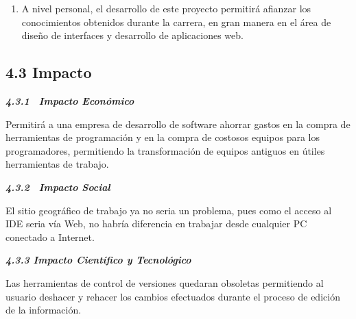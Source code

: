 \documentclass[12pt,letterpaper,oneside]{article}
\begin{document}
\bigskip


\begin{enumerate}
\item
A nivel personal, el desarrollo de este proyecto permitirá afianzar
los conocimientos obtenidos durante la carrera, en gran manera en el
área de diseño de interfaces y desarrollo de aplicaciones web.
\end{enumerate}

\bigskip

\subsection{4.3 Impacto}

\bigskip

{\bfseries\itshape
4.3.1 \ Impacto Económico}


\bigskip

{\mdseries\upshape
Permitirá a una empresa de desarrollo de software ahorrar gastos en la
compra de herramientas de programación y en la compra de costosos
equipos para los programadores, permitiendo la transformación de
equipos antiguos en útiles herramientas de trabajo.}


\bigskip

{\bfseries\itshape
4.3.2 \ Impacto Social}


\bigskip

El sitio geográfico de trabajo ya no seria un problema, pues como el
acceso al IDE seria vía Web, no habría diferencia en trabajar desde
cualquier PC conectado a Internet.


\bigskip


\bigskip

{\bfseries\itshape
4.3.3 Impacto Científico y Tecnológico}


\bigskip

{\mdseries\upshape
Las herramientas de control de versiones quedaran obsoletas permitiendo
al usuario deshacer y rehacer los cambios efectuados durante el proceso
de edición de la información.}


\bigskip


\bigskip


\bigskip


\bigskip


\bigskip


\bigskip


\bigskip


\bigskip


\bigskip


\bigskip
\end{document}
